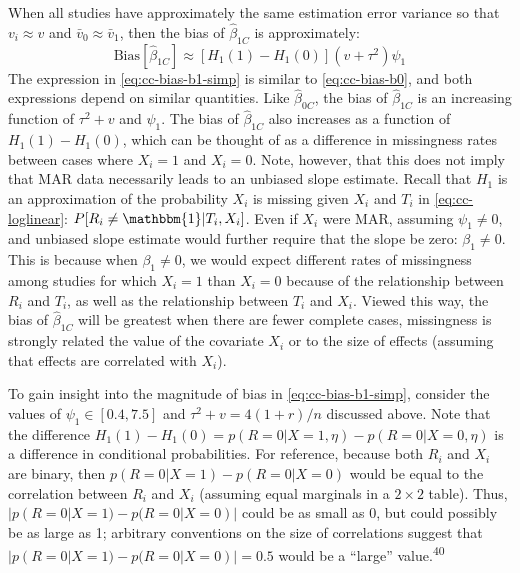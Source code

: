 \documentclass[
]{article}
\begin{document}
When all studies have approximately the same estimation error variance so that \(v_i \approx v\) and \(\bar{v}_0 \approx \bar{v}_1\), then the bias of \(\hat{\beta}_{1C}\) is approximately:
\begin{equation}
\text{Bias}[\hat{\beta}_{1C}] 
  \approx \left[H_1(1) - H_1(0)\right] (v + \tau^2) \psi_1 
\label{eq:cc-bias-b1-simp}
\end{equation}
The expression in \eqref{eq:cc-bias-b1-simp} is similar to \eqref{eq:cc-bias-b0}, and both expressions depend on similar quantities.
Like \(\hat{\beta}_{0C}\), the bias of \(\hat{\beta}_{1C}\) is an increasing function of \(\tau^2 + v\) and \(\psi_1\).
The bias of \(\hat{\beta}_{1C}\) also increases as a function of \(H_1(1) - H_1(0)\), which can be thought of as a difference in missingness rates between cases where \(X_i = 1\) and \(X_i = 0\).
Note, however, that this does not imply that MAR data necessarily leads to an unbiased slope estimate.
Recall that \(H_1\) is an approximation of the probability \(X_i\) is missing given \(X_i\) and \(T_i\) in \eqref{eq:cc-loglinear}: \(P[R_i \neq \mathbbm{1} | T_i, X_i]\).
Even if \(X_i\) were MAR, assuming \(\psi_1 \neq 0\), and unbiased slope estimate would further require that the slope be zero: \(\beta_1 \neq 0\).
This is because when \(\beta_1 \neq 0\), we would expect different rates of missingness among studies for which \(X_i = 1\) than \(X_i = 0\) because of the relationship between \(R_i\) and \(T_i\), as well as the relationship between \(T_i\) and \(X_i\).
Viewed this way, the bias of \(\hat{\beta}_{1C}\) will be greatest when there are fewer complete cases, missingness is strongly related the value of the covariate \(X_i\) or to the size of effects (assuming that effects are correlated with \(X_i\)).

To gain insight into the magnitude of bias in \eqref{eq:cc-bias-b1-simp}, consider the values of \(\psi_1 \in [0.4, 7.5]\) and \(\tau^2 + v = 4(1 + r)/n\) discussed above.
Note that the difference \(H_1(1) - H_1(0) = p(R = 0 | X = 1, \eta) - p(R = 0 | X = 0, \eta)\) is a difference in conditional probabilities.
For reference, because both \(R_i\) and \(X_i\) are binary, then \(p(R = 0 | X = 1) - p(R = 0 | X = 0)\) would be equal to the correlation between \(R_i\) and \(X_i\) (assuming equal marginals in a \(2 \times 2\) table).
Thus, \(|p(R = 0 | X = 1) - p(R = 0 | X = 0)|\) could be as small as 0, but could possibly be as large as 1; arbitrary conventions on the size of correlations suggest that \(|p(R = 0 | X = 1) - p(R = 0 | X = 0)| = 0.5\) would be a ``large'' value.\textsuperscript{40}
\end{document}
